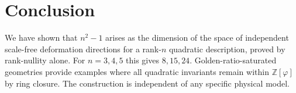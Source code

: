 \documentclass[12pt]{article}
\theoremstyle{definition}
\theoremstyle{remark}
\newcommand{\Z}{\mathbb{Z}}
\begin{document}
\section{Conclusion}

We have shown that $n^2-1$ arises as the dimension of the space of
independent scale-free deformation directions for a rank-$n$ quadratic
description, proved by rank-nullity alone. For $n=3,4,5$ this gives
$8,15,24$. Golden-ratio-saturated geometries provide examples where all
quadratic invariants remain within $\Z[\varphi]$ by ring closure. The
construction is independent of any specific physical model.



\end{document}
